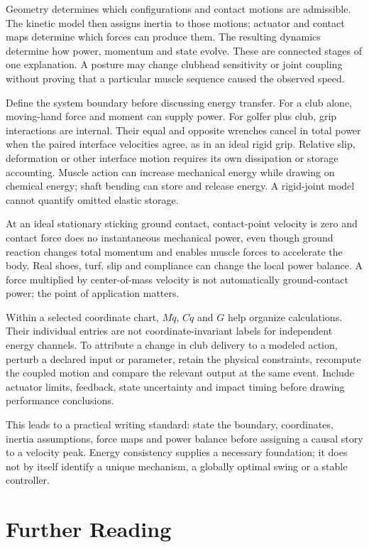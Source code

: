 Geometry determines which configurations and contact motions are admissible. The kinetic model then assigns inertia to those motions; actuator and contact maps determine which forces can produce them. The resulting dynamics determine how power, momentum and state evolve. These are connected stages of one explanation. A posture may change clubhead sensitivity or joint coupling without proving that a particular muscle sequence caused the observed speed.

Define the system boundary before discussing energy transfer. For a club alone, moving-hand force and moment can supply power. For golfer plus club, grip interactions are internal. Their equal and opposite wrenches cancel in total power when the paired interface velocities agree, as in an ideal rigid grip. Relative slip, deformation or other interface motion requires its own dissipation or storage accounting. Muscle action can increase mechanical energy while drawing on chemical energy; shaft bending can store and release energy. A rigid-joint model cannot quantify omitted elastic storage.

At an ideal stationary sticking ground contact, contact-point velocity is zero and contact force does no instantaneous mechanical power, even though ground reaction changes total momentum and enables muscle forces to accelerate the body. Real shoes, turf, slip and compliance can change the local power balance. A force multiplied by center-of-mass velocity is not automatically ground-contact power; the point of application matters.

Within a selected coordinate chart, $M\ddot q$, $C\dot q$ and $G$ help organize calculations. Their individual entries are not coordinate-invariant labels for independent energy channels. To attribute a change in club delivery to a modeled action, perturb a declared input or parameter, retain the physical constraints, recompute the coupled motion and compare the relevant output at the same event. Include actuator limits, feedback, state uncertainty and impact timing before drawing performance conclusions.

This leads to a practical writing standard: state the boundary, coordinates, inertia assumptions, force maps and power balance before assigning a causal story to a velocity peak. Energy consistency supplies a necessary foundation; it does not by itself identify a unique mechanism, a globally optimal swing or a stable controller.

\section{Further Reading}
\label{sec:lagrangian_reading}

